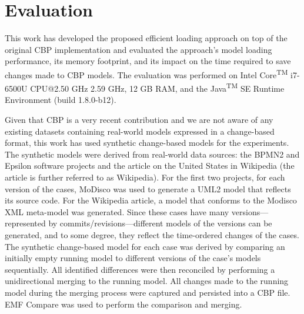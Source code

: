 {  \section{Evaluation}
  \label{sec:evaluation_4}
  
  This work has developed the proposed efficient loading approach on top of the original CBP implementation \cite{DBLP:conf/models/YohannisKP17,epsilonlabs2019emfcbp} and evaluated the approach’s model loading performance, its memory footprint, and its impact on the time required to save changes made to CBP models. The evaluation was performed on Intel\textsuperscript{\textregistered} Core\textsuperscript{TM} i7-6500U CPU@2.50 GHz 2.59 GHz, 12 GB RAM, and the Java\textsuperscript{TM} SE Runtime Environment (build 1.8.0-b12).
  
  Given that CBP is a very recent contribution and we are not aware of any existing datasets containing real-world models expressed in a change-based format, this work has used synthetic change-based models for the experiments. The synthetic models were derived from real-world data sources: the BPMN2 \cite{eclipse2017bpmn2,eclipse2018bpmn2git} and Epsilon \cite{eclipse2017epsilon,eclipse2018epsilongit} software projects and the article on the United States \cite{wikipedia2018us} in Wikipedia (the article is further referred to as Wikipedia). For the first two projects, for each version of the cases, MoDisco \cite{DBLP:journals/infsof/BruneliereCDM14} was used to generate a UML2 \cite{eclipse2017uml2} model that reflects its source code. For the Wikipedia article, a model that conforms to the Modisco XML meta-model \cite{eclipse2018modiscoxml} was generated. Since these cases have many versions—represented by commits/revisions—different models of the versions can be generated, and to some degree, they reflect the time-ordered changes of the cases. The synthetic change-based model for each case was derived by comparing an initially empty running model to different versions of the case’s models sequentially. All identified differences were then reconciled by performing a unidirectional merging to the running model. All changes made to the running model during the merging process were captured and persisted into a CBP file. EMF Compare was used \cite{eclipse2017compare} to perform the comparison and merging.
  
}
